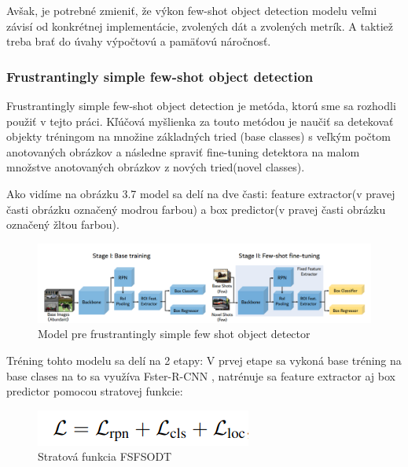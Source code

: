 Avšak, je potrebné zmieniť, že výkon few-shot object detection modelu veľmi závisí od konkrétnej implementácie, zvolených dát a zvolených metrík. A taktiež treba brať do úvahy výpočtovú a pamäťovú náročnosť. 

\subsubsection{Frustrantingly simple few-shot object detection}

\hspace{\parindent}Frustrantingly simple few-shot object detection \cite{FSFSODT} je metóda, ktorú sme sa rozhodli použiť v tejto práci. Kľúčová myšlienka za touto metódou je naučiť sa detekovať objekty tréningom na množine základných tried (base classes) s veľkým počtom anotovaných obrázkov a následne spraviť fine-tuning detektora na malom množstve anotovaných obrázkov z nových tried(novel classes). 

Ako vidíme na obrázku 3.7 model sa delí na dve časti: feature extractor(v pravej časti obrázku označený modrou farbou) a box predictor(v pravej časti obrázku označený žltou farbou). 

\begin{figure}[!hbt]
\includegraphics[width=\textwidth]{images/FSFSOD_model.png}
\caption{Model pre frustrantingly simple few shot object detector}
\label{fig:image}
\end{figure}

Tréning tohto modelu sa delí na 2 etapy: V prvej etape sa vykoná base tréning na base clases na to sa využíva Fster-R-CNN \cite{Faster}, natrénuje sa feature extractor aj box predictor pomocou stratovej funkcie: 

\begin{figure}[!hbt]
\includegraphics[width=\textwidth]{images/FSFSOD_loss.png}
\caption{Stratová funkcia FSFSODT}
\label{fig:image}
\end{figure}


